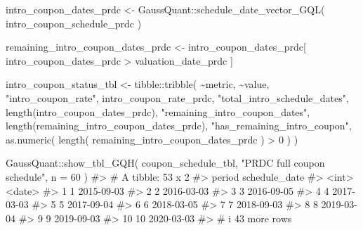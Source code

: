 \documentclass[
  letterpaper,
  DIV=11,
  numbers=noendperiod]{scrreprt}
\newenvironment{Shaded}{\begin{snugshade}}{\end{snugshade}}
\newcommand{\AttributeTok}[1]{\textcolor[rgb]{0.40,0.45,0.13}{#1}}
\newcommand{\CommentTok}[1]{\textcolor[rgb]{0.37,0.37,0.37}{#1}}
\newcommand{\DecValTok}[1]{\textcolor[rgb]{0.68,0.00,0.00}{#1}}
\newcommand{\FunctionTok}[1]{\textcolor[rgb]{0.28,0.35,0.67}{#1}}
\newcommand{\NormalTok}[1]{\textcolor[rgb]{0.00,0.23,0.31}{#1}}
\newcommand{\OtherTok}[1]{\textcolor[rgb]{0.00,0.23,0.31}{#1}}
\newcommand{\SpecialCharTok}[1]{\textcolor[rgb]{0.37,0.37,0.37}{#1}}
\newcommand{\StringTok}[1]{\textcolor[rgb]{0.13,0.47,0.30}{#1}}
\begin{document}
\begin{Shaded}
\begin{Highlighting}[]
\NormalTok{intro\_coupon\_dates\_prdc }\OtherTok{\textless{}{-}}\NormalTok{ GaussQuant}\SpecialCharTok{::}\FunctionTok{schedule\_date\_vector\_GQL}\NormalTok{(}
\NormalTok{  intro\_coupon\_schedule\_prdc}
\NormalTok{)}

\NormalTok{remaining\_intro\_coupon\_dates\_prdc }\OtherTok{\textless{}{-}}\NormalTok{ intro\_coupon\_dates\_prdc[}
\NormalTok{  intro\_coupon\_dates\_prdc }\SpecialCharTok{\textgreater{}}
\NormalTok{    valuation\_date\_prdc}
\NormalTok{]}

\NormalTok{intro\_coupon\_status\_tbl }\OtherTok{\textless{}{-}}\NormalTok{ tibble}\SpecialCharTok{::}\FunctionTok{tribble}\NormalTok{(}
  \SpecialCharTok{\textasciitilde{}}\NormalTok{metric,                        }\SpecialCharTok{\textasciitilde{}}\NormalTok{value,}
  \StringTok{"intro\_coupon\_rate"}\NormalTok{,             intro\_coupon\_rate\_prdc,}
  \StringTok{"total\_intro\_schedule\_dates"}\NormalTok{,    }\FunctionTok{length}\NormalTok{(intro\_coupon\_dates\_prdc),}
  \StringTok{"remaining\_intro\_coupon\_dates"}\NormalTok{,  }\FunctionTok{length}\NormalTok{(remaining\_intro\_coupon\_dates\_prdc),}
  \StringTok{"has\_remaining\_intro\_coupon"}\NormalTok{,    }\FunctionTok{as.numeric}\NormalTok{(}
                                      \FunctionTok{length}\NormalTok{(}
\NormalTok{                                        remaining\_intro\_coupon\_dates\_prdc}
\NormalTok{                                      ) }\SpecialCharTok{\textgreater{}} \DecValTok{0}
\NormalTok{                                    )}
\NormalTok{)}

\NormalTok{GaussQuant}\SpecialCharTok{::}\FunctionTok{show\_tbl\_GQH}\NormalTok{(}
\NormalTok{  coupon\_schedule\_tbl,}
  \StringTok{"PRDC full coupon schedule"}\NormalTok{,}
  \AttributeTok{n =} \DecValTok{60}
\NormalTok{)}
\CommentTok{\#\textgreater{} \# A tibble: 53 x 2}
\CommentTok{\#\textgreater{}    period schedule\_date}
\CommentTok{\#\textgreater{}     \textless{}int\textgreater{} \textless{}date\textgreater{}       }
\CommentTok{\#\textgreater{}  1      1 2015{-}09{-}03   }
\CommentTok{\#\textgreater{}  2      2 2016{-}03{-}03   }
\CommentTok{\#\textgreater{}  3      3 2016{-}09{-}05   }
\CommentTok{\#\textgreater{}  4      4 2017{-}03{-}03   }
\CommentTok{\#\textgreater{}  5      5 2017{-}09{-}04   }
\CommentTok{\#\textgreater{}  6      6 2018{-}03{-}05   }
\CommentTok{\#\textgreater{}  7      7 2018{-}09{-}03   }
\CommentTok{\#\textgreater{}  8      8 2019{-}03{-}04   }
\CommentTok{\#\textgreater{}  9      9 2019{-}09{-}03   }
\CommentTok{\#\textgreater{} 10     10 2020{-}03{-}03   }
\CommentTok{\#\textgreater{} \# i 43 more rows}


\end{Highlighting}
\end{Shaded}
\end{document}
